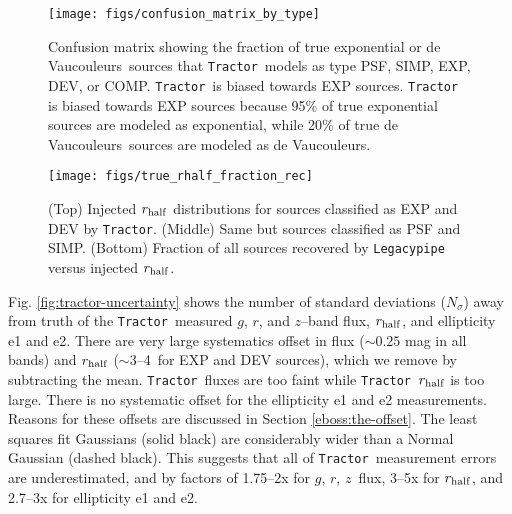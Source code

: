 \documentclass[a4paper,fleqn,usenatbib]{mnras}
\newcommand{\rhalf}{r_{\rm{half}}}
\newcommand{\gb}{$g$}
\newcommand{\rband}{$r$}
\newcommand{\zb}{$z$}
\newcommand{\tractor}{{\tt Tractor}}
\newcommand{\legacypipe}{{\tt Legacypipe}}
\newcommand{\dev}{de Vaucouleurs}
\begin{document}
\begin{figure}
\begin{center}
 \texttt{[image: figs/confusion\_matrix\_by\_type]}
\end{center}
 \caption[Confusion matrix for \tractor\, model selection]{Confusion matrix showing the fraction of true exponential or \dev\, sources that \tractor\, models as type PSF, SIMP, EXP, DEV, or COMP. \tractor\, is biased towards EXP sources. \tractor\, is biased towards EXP sources because 95\% of true exponential sources are modeled as exponential, while 20\% of true \dev\, sources are modeled as \dev.}
 \label{fig:confusion}
\end{figure}


\begin{figure}
\begin{center}
 \texttt{[image: figs/true\_rhalf\_fraction\_rec]}
\end{center}
 \caption[Injected $\rhalf$ distributions and fraction recovered]{(Top) Injected $\rhalf$ distributions for sources classified as EXP and DEV by \tractor. (Middle) Same but sources classified as PSF and SIMP. (Bottom) Fraction of all sources recovered by \legacypipe\, versus injected $\rhalf$.}
 \label{fig:rhalf-input}
\end{figure}


Fig. \ref{fig:tractor-uncertainty} shows the number of standard deviations ($N_\sigma$) away from truth of the \tractor\, measured \gb, \rband, and \zb--band flux, $\rhalf$, and ellipticity e1 and e2. There are very large systematics offset in flux ($\sim 0.25$ mag in all bands) and $\rhalf$ ($\sim $3--4\arcsec\, for EXP and DEV sources), which we remove by subtracting the mean. \tractor\, fluxes are too faint while \tractor\, $\rhalf$ is too large. There is no systematic offset for the ellipticity e1 and e2 measurements. Reasons for these offsets are discussed in Section \ref{eboss:the-offset}. The least squares fit Gaussians (solid black) are considerably wider than a Normal Gaussian (dashed black). This suggests that all of \tractor\, measurement errors are underestimated, and by factors of 1.75--2x for \gb, \rband, \zb\, flux, 3--5x for $\rhalf$, and 2.7--3x for ellipticity e1 and e2.
\end{document}
